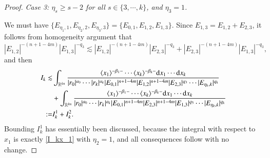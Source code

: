 \documentclass[11pt,reqno]{amsart}
\def\d{{\rm d}}
\numberwithin{equation}{section}
\theoremstyle{definition}
\begin{document}
\begin{proof}
	\noindent\emph{Case 3: $\eta_s\geq s-2$ for all $s\in\{3,\cdots,k\}$, and $\eta_3=1$.}
	
	We must have $\{E_{\eta_1,1},E_{\eta_2,2},E_{\eta_3,3}\}=\{E_{0,1},E_{1,2},E_{1,3}\}$. Since $E_{1,3}=E_{1,2}+E_{2,3}$, it follows from homogeneity argument that
	\begin{equation*}
		|E_{1,2}|^{-(n+1-4m)}|E_{1,3}|^{-q_3}\lesssim|E_{1,2}|^{-(n+1-4m)}|E_{2,3}|^{-q_3}+|E_{2,3}|^{-(n+1-4m)}|E_{1,3}|^{-q_3},
	\end{equation*}
	and then
	\begin{equation*}
		\begin{split}
			I_k\lesssim&\int_{\mathbb{R}^{kn}}\frac{\langle x_1\rangle^{-\beta_1-}\cdots\langle x_k\rangle^{-\beta_k-}\d x_1\cdots \d x_k}{|r_0|^{a_0}\cdots|r_k|^{a_k}|E_{0,1}|^{n+1-4m}|E_{1,2}|^{n+1-4m}|E_{2,3}|^{q_3}\cdots|E_{\eta_k,k}|^{q_k}}\\
			&+\int_{\mathbb{R}^{kn}}\frac{\langle x_1\rangle^{-\beta_1-}\cdots\langle x_k\rangle^{-\beta_k-}\d x_1\cdots \d x_k}{|r_0|^{a_0}\cdots|r_k|^{a_k}|E_{0,1}|^{n+1-4m}|E_{2,3}|^{n+1-4m}|E_{1,3}|^{q_3}\cdots|E_{\eta_k,k}|^{q_k}}\\
			:=&I_k^1+I_k^2.
		\end{split}
	\end{equation*}
	Bounding $I_k^1$ has essentially been discussed, because the integral with respect to $x_1$ is exactly \eqref{I_kx_1} with $\eta_2=1$, and all consequences follow with no change.
	

\end{proof}
\end{document}
